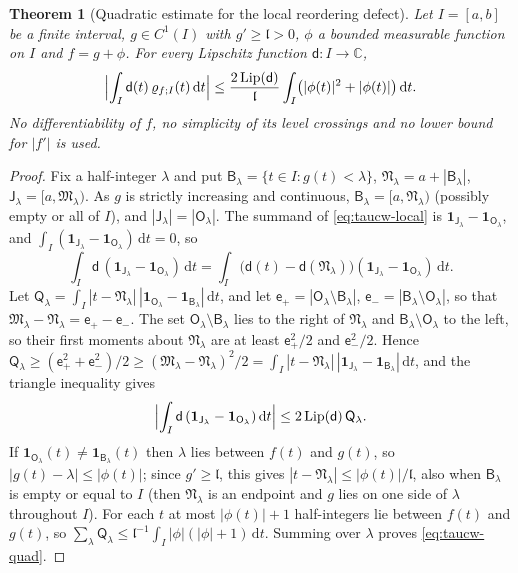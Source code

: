 \documentclass[11pt,a4paper]{article}
\numberwithin{equation}{section}
\newtheorem{theorem}{Theorem}[section]
\theoremstyle{definition}
\theoremstyle{remark}
\newcommand{\ind}{\mathbf 1}
\newcommand{\dd}{\,\mathrm dt}
\begin{document}
\begin{theorem}[Quadratic estimate for the local reordering defect]\label{thm:taucw-quad}
Let $I=[a,b]$ be a finite interval, $g\in C^1(I)$ with $g'\ge\mathfrak l>0$, $\phi$ a bounded measurable function on $I$ and $f=g+\phi$. For every Lipschitz function $\mathsf d:I\to\mathbb C$,
\begin{equation}\label{eq:taucw-quad}
\Bigl|\int_I\mathsf d(t)\,\varrho_{f;I}(t)\dd\Bigr|\le\frac{2\operatorname{Lip}(\mathsf d)}{\mathfrak l}\int_I\bigl(|\phi(t)|^2+|\phi(t)|\bigr)\dd.
\end{equation}
No differentiability of $f$, no simplicity of its level crossings and no lower bound for $|f'|$ is used.
\end{theorem}
\begin{proof}
Fix a half-integer $\lambda$ and put $\mathsf B_\lambda=\{t\in I:g(t)<\lambda\}$, $\mathfrak N_\lambda=a+|\mathsf B_\lambda|$, $\mathsf J_\lambda=[a,\mathfrak M_\lambda)$. As $g$ is strictly increasing and continuous, $\mathsf B_\lambda=[a,\mathfrak N_\lambda)$ (possibly empty or all of $I$), and $|\mathsf J_\lambda|=|\mathsf O_\lambda|$. The summand of \eqref{eq:taucw-local} is $\ind_{\mathsf J_\lambda}-\ind_{\mathsf O_\lambda}$, and $\int_I(\ind_{\mathsf J_\lambda}-\ind_{\mathsf O_\lambda})\dd=0$, so
\begin{equation}
\int_I\mathsf d\,(\ind_{\mathsf J_\lambda}-\ind_{\mathsf O_\lambda})\dd=\int_I\bigl(\mathsf d(t)-\mathsf d(\mathfrak N_\lambda)\bigr)(\ind_{\mathsf J_\lambda}-\ind_{\mathsf O_\lambda})\dd .
\end{equation}
Let $\mathsf Q_\lambda=\int_I|t-\mathfrak N_\lambda|\,|\ind_{\mathsf O_\lambda}-\ind_{\mathsf B_\lambda}|\dd$, and let $\mathsf e_+=|\mathsf O_\lambda\setminus\mathsf B_\lambda|$, $\mathsf e_-=|\mathsf B_\lambda\setminus\mathsf O_\lambda|$, so that $\mathfrak M_\lambda-\mathfrak N_\lambda=\mathsf e_+-\mathsf e_-$. The set $\mathsf O_\lambda\setminus\mathsf B_\lambda$ lies to the right of $\mathfrak N_\lambda$ and $\mathsf B_\lambda\setminus\mathsf O_\lambda$ to the left, so their first moments about $\mathfrak N_\lambda$ are at least $\mathsf e_+^2/2$ and $\mathsf e_-^2/2$. Hence $\mathsf Q_\lambda\ge(\mathsf e_+^2+\mathsf e_-^2)/2\ge(\mathfrak M_\lambda-\mathfrak N_\lambda)^2/2=\int_I|t-\mathfrak N_\lambda|\,|\ind_{\mathsf J_\lambda}-\ind_{\mathsf B_\lambda}|\dd$, and the triangle inequality gives
\begin{equation}
\Bigl|\int_I\mathsf d\,(\ind_{\mathsf J_\lambda}-\ind_{\mathsf O_\lambda})\dd\Bigr|\le2\operatorname{Lip}(\mathsf d)\,\mathsf Q_\lambda .
\end{equation}
If $\ind_{\mathsf O_\lambda}(t)\ne\ind_{\mathsf B_\lambda}(t)$ then $\lambda$ lies between $f(t)$ and $g(t)$, so $|g(t)-\lambda|\le|\phi(t)|$; since $g'\ge\mathfrak l$, this gives $|t-\mathfrak N_\lambda|\le|\phi(t)|/\mathfrak l$, also when $\mathsf B_\lambda$ is empty or equal to $I$ (then $\mathfrak N_\lambda$ is an endpoint and $g$ lies on one side of $\lambda$ throughout $I$). For each $t$ at most $|\phi(t)|+1$ half-integers lie between $f(t)$ and $g(t)$, so $\sum_\lambda \mathsf Q_\lambda\le\mathfrak l^{-1}\int_I|\phi|(|\phi|+1)\dd$. Summing over $\lambda$ proves \eqref{eq:taucw-quad}.
\end{proof}
\end{document}

